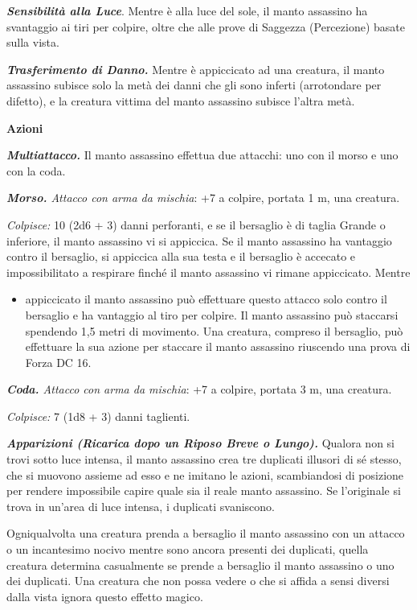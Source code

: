 \begin{multicols}{2}
\emph{\textbf{Sensibilità alla Luce}}. Mentre è alla luce del sole, il
manto assassino ha svantaggio ai tiri per colpire, oltre che alle prove
di Saggezza (Percezione) basate sulla vista.

\emph{\textbf{Trasferimento di Danno.}} Mentre è appiccicato ad una
creatura, il manto assassino subisce solo la metà dei danni che gli sono
inferti (arrotondare per difetto), e la creatura vittima del manto
assassino subisce l'altra metà.

\smallskip\textbf{Azioni}

\emph{\textbf{Multiattacco.}} Il manto assassino effettua due attacchi:
uno con il morso e uno con la coda.

\emph{\textbf{Morso.} Attacco con arma da mischia}: +7 a colpire,
portata 1 m, una creatura.

\emph{Colpisce:} 10 (2d6 + 3) danni perforanti, e se il bersaglio è di
taglia Grande o inferiore, il manto assassino vi si appiccica. Se il
manto assassino ha vantaggio contro il bersaglio, si appiccica alla sua
testa e il bersaglio è accecato e impossibilitato a respirare finché il
manto assassino vi rimane appiccicato. Mentre


\begin{itemize}
\item
  appiccicato il manto assassino può effettuare questo attacco solo
  contro il bersaglio e ha vantaggio al tiro per colpire. Il manto
  assassino può staccarsi spendendo 1,5 metri di movimento. Una
  creatura, compreso il bersaglio, può effettuare la sua azione per
  staccare il manto assassino riuscendo una prova di Forza DC 16.
\end{itemize}


\emph{\textbf{Coda.} Attacco con arma da mischia}: +7 a colpire, portata
3 m, una creatura.

\emph{Colpisce:} 7 (1d8 + 3) danni taglienti.

\emph{\textbf{Apparizioni (Ricarica dopo un Riposo Breve o Lungo).}}
Qualora non si trovi sotto luce intensa, il manto assassino crea tre
duplicati illusori di sé stesso, che si muovono assieme ad esso e ne
imitano le azioni, scambiandosi di posizione per rendere impossibile
capire quale sia il reale manto assassino. Se l'originale si trova in
un'area di luce intensa, i duplicati svaniscono.

Ogniqualvolta una creatura prenda a bersaglio il manto assassino con un
attacco o un incantesimo nocivo mentre sono ancora presenti dei
duplicati, quella creatura determina casualmente se prende a bersaglio
il manto assassino o uno dei duplicati. Una creatura che non possa
vedere o che si affida a sensi diversi dalla vista ignora questo effetto
magico.


\end{multicols}
